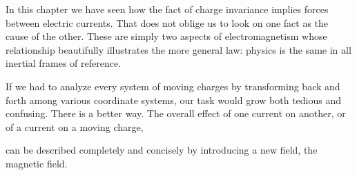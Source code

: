 In this chapter we have seen how the fact of charge invariance implies
forces between electric currents. That does not oblige us to
look on one fact as the cause of the other. These are simply two
aspects of electromagnetism whose relationship beautifully illustrates
the more general law: physics is the same in all inertial frames
of reference.

If we had to analyze every system of moving charges by transforming
back and forth among various coordinate systems, our task would
grow both tedious and confusing. There is a better way. The overall
effect of one current on another, or of a current on a moving charge,

can be described completely and concisely by introducing a new field,
the magnetic field.

\fi
